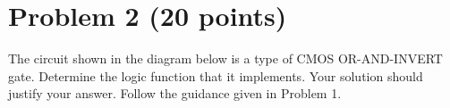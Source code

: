 \documentclass{article}
\begin{document}
\section*{Problem 2 (20 points)}
The circuit shown in the diagram below is a type of CMOS OR-AND-INVERT gate. Determine the logic  function  that  it  implements.  Your  solution  should  justify  your  answer.  Follow  the  guidance  given  in Problem 1.

\begin{center}
\end{center}
\end{document}

